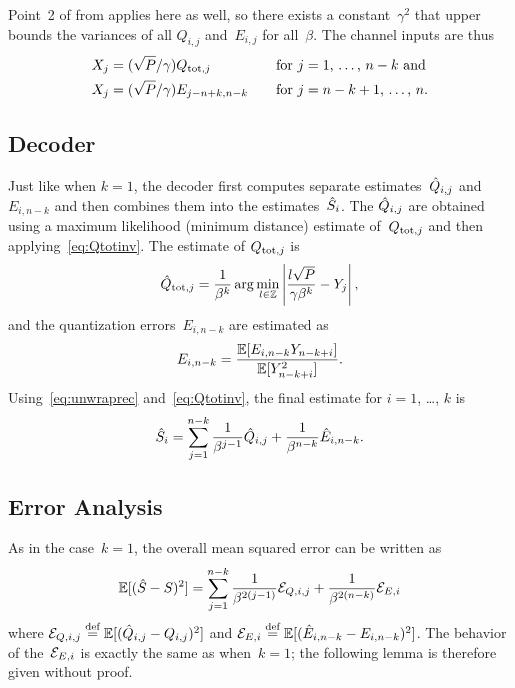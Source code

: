 Point~2 of  from  applies here as
well, so there exists a constant~$\gamma^2$ that upper bounds the variances of
all $Q_{i,j}$ and~$E_{i,j}$ for all~$\beta$. The channel inputs are thus
\begin{align*}
  X_j &= (\sqrt{P}/\gamma) Q_{\operatorname{tot},j} &&\quad\text{for $j = 1$, \dots, $n-k$ and}
  \\
  X_j &= (\sqrt{P}/\gamma) E_{j-n+k,n-k} &&\quad\text{for $j = n-k+1$, \dots,
  $n$.}
\end{align*}


\subsection{Decoder}

Just like when $k=1$, the decoder first computes separate estimates~$\hat{Q}_{i,j}$
and~$E_{i,n-k}$ and then combines them into the estimates~${\hat{S}}_i$. The
$\hat{Q}_{i,j}$ are obtained using a maximum likelihood (minimum distance) estimate
of~$Q_{\operatorname{tot},j}$ and then applying~\eqref{eq:Qtotinv}. The estimate of
$Q_{\operatorname{tot},j}$ is
\begin{equation*}
  \hat{Q}_{\operatorname{tot},j} = \frac{1}{\beta^k} \arg\min_{l\in\mathbb{Z}}
  \left| \frac{l\sqrt P}{\gamma \beta^k} - Y_j \right|,
\end{equation*}
and the quantization errors~$E_{i,n-k}$ are estimated as
\begin{equation*}
  E_{i,n-k} = \frac{\mathbb{E}[E_{i,n-k} Y_{n-k+i}]}{\mathbb{E}[Y_{n-k+i}^2]}.
\end{equation*}
Using~\eqref{eq:unwraprec} and~\eqref{eq:Qtotinv}, the final estimate for $i =
1$, \dots, $k$ is
\begin{equation*}
  {\hat{S}}_i = \sum_{j=1}^{n-k} \frac{1}{\beta^{j-1}} \hat{Q}_{i,j} +
  \frac{1}{\beta^{n-k}} \hat{E}_{i,n-k}.
\end{equation*}


\subsection{Error Analysis}

As in the case~$k=1$, the overall mean squared error can be written as
\begin{equation*}
  {\mathbb{E}[({\hat{S}}- S)^2]} = \sum_{j=1}^{n-k} \frac{1}{\beta^{2(j-1)}} {\mathcal{E}}_{Q,i,j} + 
  \frac{1}{\beta^{2(n-k)}} {\mathcal{E}}_{E,i}
\end{equation*}
where ${\mathcal{E}}_{Q,i,j} \stackrel{\text{def}}{=} \mathbb{E}[(\hat{Q}_{i,j} - Q_{i,j})^2]$ and ${\mathcal{E}}_{E,i} \stackrel{\text{def}}{=}
\mathbb{E}[(\hat{E}_{i,n-k} - E_{i,n-k})^2]$. The behavior of the~${\mathcal{E}}_{E,i}$ is exactly
the same as when~$k=1$; the following lemma is therefore given without proof.

